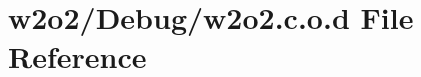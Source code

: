 \hypertarget{w2o2_8c_8o_8d}{}\section{w2o2/\+Debug/w2o2.c.\+o.\+d File Reference}
\label{w2o2_8c_8o_8d}
